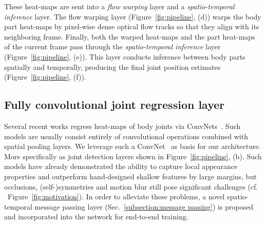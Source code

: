 \documentclass[10pt,twocolumn,letterpaper]{article}
\newcommand{\figref}[1]{Figure~\ref{#1}}
\newcommand{\secref}[1]{Sec.~\ref{#1}}
\begin{document}

These heat-maps are sent into a \emph{flow warping} layer and a \emph{spatio-temporal inference} layer. The flow warping layer (\figref{fig:pipeline}, (d)) warps the body part heat-maps by pixel-wise dense optical flow tracks so that they align with its neighboring frame. Finally, both the warped heat-maps and the part heat-maps of the current frame pass through the \emph{spatio-temporal inference} layer (\figref{fig:pipeline}, (e)). This layer conducts inference between body parts spatially and temporally, producing the final joint position estimates (\figref{fig:pipeline}, (f)).

\subsection{Fully convolutional joint regression layer}\label{subsection:fully ConvNet}
Several recent works regress heat-maps of body joints
via ConvNets~\cite{chen2014articulated,ouyang2014multi,pishchulin2015deepcut,tompson2014joint,wei2016cpm,newell2016stacked}. Such models are usually consist entirely of convolutional operations combined with spatial pooling layers. We leverage such a ConvNet~\cite{wei2016cpm} as basis for our architecture. More specifically as joint detection layers shown in \figref{fig:pipeline}, (b). Such models have already demonstrated the ability to capture local appearance properties and outperform hand-designed shallow features by large margins, but occlusions, (self-)symmetries and motion blur still pose significant challenges (cf. ~\figref{fig:motivation}). In order to alleviate these problems, a novel spatio-temporal message passing layer (\secref{subsection:message passing}) is proposed and incorporated into the network for end-to-end training.
\end{document}
